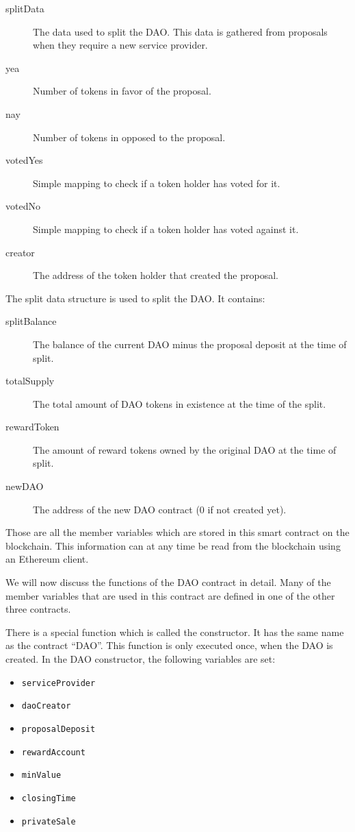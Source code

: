\documentclass[9pt,oneside]{amsart}
\begin{document}
\begin{multicols}{2}
\begin{description}
 \item[splitData] The data used to split the DAO. This data is gathered from proposals when they require a new service provider.
 \item[yea] Number of tokens in favor of the proposal.
 \item[nay] Number of tokens in opposed to the proposal.
 \item[votedYes] Simple mapping to check if a token holder has voted for it.
 \item[votedNo] Simple mapping to check if a token holder has voted against it.
 \item[creator] The address of the token holder that created the proposal.
\end{description}

The split data structure is used to split the DAO. It contains:
\begin{description}
 \item[splitBalance] The balance of the current DAO minus the proposal deposit at the time of split.
 \item[totalSupply] The total amount of DAO tokens in existence at the time of the split.
 \item[rewardToken] The amount of reward tokens owned by the original DAO at the time of split.
 \item[newDAO] The address of the new DAO contract ($0$ if not created yet).
\end{description}

Those are all the member variables which are stored in this smart contract on the blockchain. This information can at any time be read from the blockchain using an Ethereum client.

We will now discuss the functions of the DAO contract in detail. Many of the member variables that are used in this contract are defined in one of the other three contracts. 

There is a special function which is called the constructor. It has the same name as the contract ``DAO''. This function is only executed once, when the DAO is created.
In the DAO constructor, the following variables are set:
\begin{itemize}
 \item \verb|serviceProvider|
 \item \verb|daoCreator|
 \item \verb|proposalDeposit|
 \item \verb|rewardAccount| 
 \item \verb|minValue|
 \item \verb|closingTime|
 \item \verb|privateSale|
\end{itemize}


\end{multicols}
\end{document}
